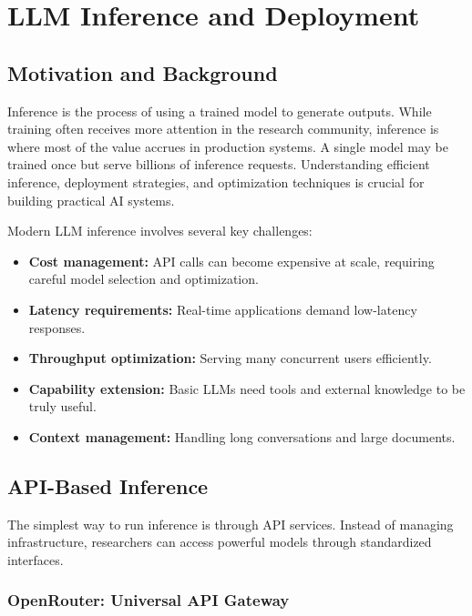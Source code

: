 \documentclass[class=article,crop=false]{standalone}
\begin{document}
\section{LLM Inference and Deployment}
\label{sec:inference}

\subsection{Motivation and Background}
\label{sec:inference:motivation}

Inference is the process of using a trained model to generate outputs. While training often receives more attention in the research community, inference is where most of the value accrues in production systems. A single model may be trained once but serve billions of inference requests. Understanding efficient inference, deployment strategies, and optimization techniques is crucial for building practical AI systems.

Modern LLM inference involves several key challenges:
\begin{itemize}
  \item \textbf{Cost management:} API calls can become expensive at scale, requiring careful model selection and optimization.
  \item \textbf{Latency requirements:} Real-time applications demand low-latency responses.
  \item \textbf{Throughput optimization:} Serving many concurrent users efficiently.
  \item \textbf{Capability extension:} Basic LLMs need tools and external knowledge to be truly useful.
  \item \textbf{Context management:} Handling long conversations and large documents.
\end{itemize}

\subsection{API-Based Inference}
\label{sec:inference:api}

The simplest way to run inference is through API services. Instead of managing infrastructure, researchers can access powerful models through standardized interfaces.

\subsubsection{OpenRouter: Universal API Gateway}
\end{document}
